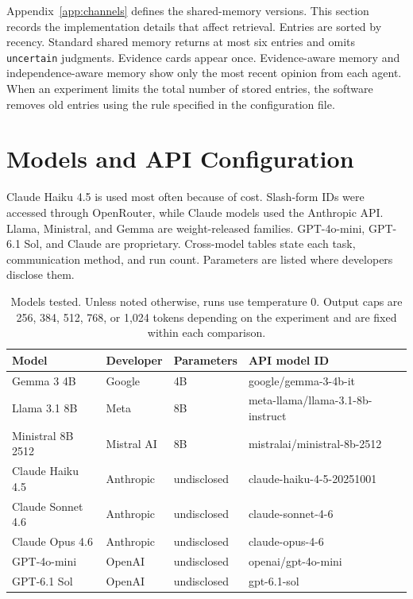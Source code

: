 Appendix~\ref{app:channels} defines the shared-memory versions. This section records the implementation details that affect retrieval. Entries are sorted by recency. Standard shared memory returns at most six entries and omits \texttt{uncertain} judgments. Evidence cards appear once. Evidence-aware memory and independence-aware memory show only the most recent opinion from each agent. When an experiment limits the total number of stored entries, the software removes old entries using the rule specified in the configuration file.

\clearpage
\section{Models and API Configuration}
\label{app:models}

Claude Haiku 4.5 is used most often because of cost. Slash-form IDs were accessed through OpenRouter, while Claude models used the Anthropic API. Llama, Ministral, and Gemma are weight-released families. GPT-4o-mini, GPT-6.1 Sol, and Claude are proprietary. Cross-model tables state each task, communication method, and run count. Parameters are listed where developers disclose them.

\begin{table}[htbp]
\caption{Models tested. Unless noted otherwise, runs use temperature 0. Output caps are 256, 384, 512, 768, or 1,024 tokens depending on the experiment and are fixed within each comparison.}
\label{tab:models}
\begin{center}
\small
\begin{tabular}{llll}
\toprule
Model & Developer & Parameters & API model ID \\
\midrule
Gemma 3 4B & Google & 4B & google/gemma-3-4b-it \\
Llama 3.1 8B & Meta & 8B & meta-llama/llama-3.1-8b-instruct \\
Ministral 8B 2512 & Mistral AI & 8B & mistralai/ministral-8b-2512 \\
Claude Haiku 4.5 & Anthropic & undisclosed & claude-haiku-4-5-20251001 \\
Claude Sonnet 4.6 & Anthropic & undisclosed & claude-sonnet-4-6 \\
Claude Opus 4.6 & Anthropic & undisclosed & claude-opus-4-6 \\
GPT-4o-mini & OpenAI & undisclosed & openai/gpt-4o-mini \\
GPT-6.1 Sol & OpenAI & undisclosed & gpt-6.1-sol \\
\bottomrule
\end{tabular}
\end{center}
\end{table}

